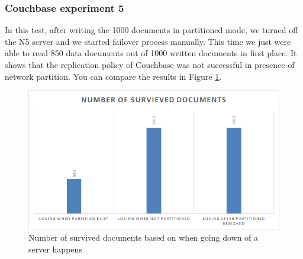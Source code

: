 \documentclass[a4paper]{article}
\begin{document}
\subsubsection{Couchbase experiment 5}
In this test, after writing the 1000 documents in partitioned mode, we turned off the N5 server and we started failover process manually.
This time we just were able to read 850 data documents out of 1000 written documents in first place. 
It shows that the replication policy of Couchbase was not successful in presence of network partition.
You can compare the results in Figure \ref{fig:diagram6}.
\begin{figure}[h!]
	\centering
	\includegraphics[width=\textwidth]{diagram6}
	\caption{Number of survived documents based on when going down of a server happens}
	\label{fig:diagram6}
\end{figure}
\end{document}

